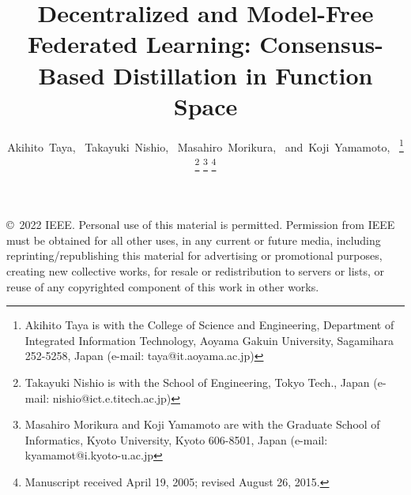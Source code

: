 \documentclass[journal]{IEEEtran}
\begin{document}
\begin{figure*}
\Large{\copyright\ 2022 IEEE. Personal use of this material is permitted. Permission
from IEEE must be obtained for all other uses, in any current or future
media, including reprinting/republishing this material for advertising or
promotional purposes, creating new collective works, for resale or
redistribution to servers or lists, or reuse of any copyrighted
component of this work in other works.}
\end{figure*}
\clearpage
\setcounter{page}{1}
\title{Decentralized and Model-Free Federated Learning: Consensus-Based Distillation in Function Space}
%
%

\author{Akihito~Taya,~
        Takayuki~Nishio,~
        Masahiro~Morikura,~
        and~Koji~Yamamoto,~%
\thanks{Akihito Taya
is with the College of Science and Engineering, Department of Integrated Information Technology, Aoyama Gakuin University, Sagamihara 252-5258, Japan
(e-mail: taya@it.aoyama.ac.jp)}%
\thanks{Takayuki Nishio
is with the School of Engineering, Tokyo Tech., Japan
(e-mail: nishio@ict.e.titech.ac.jp)}%
\thanks{Masahiro Morikura and Koji Yamamoto
are with the Graduate School of Informatics, Kyoto University, Kyoto 606-8501, Japan
(e-mail: kyamamot@i.kyoto-u.ac.jp}%
\thanks{Manuscript received April 19, 2005; revised August 26, 2015.}}
\end{document}
